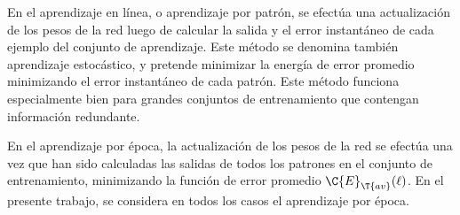 En el aprendizaje en línea, o aprendizaje por patrón, se efectúa una
actualización de los pesos de la red luego de calcular la salida y el
error instantáneo de cada ejemplo del conjunto de aprendizaje.  Este
método se denomina también aprendizaje estocástico, y pretende
minimizar la energía de error promedio minimizando el error
instantáneo de cada patrón.  Este método funciona especialmente bien
para grandes conjuntos de entrenamiento que contengan información
redundante.

En el aprendizaje por época, la actualización de los pesos de la red
se efectúa una vez que han sido calculadas las salidas de todos los
patrones en el conjunto de entrenamiento, minimizando la función de
error promedio $\C{E}_{\T{av}}(\ell)$. En el presente trabajo,
se considera en todos los casos el aprendizaje por época.




